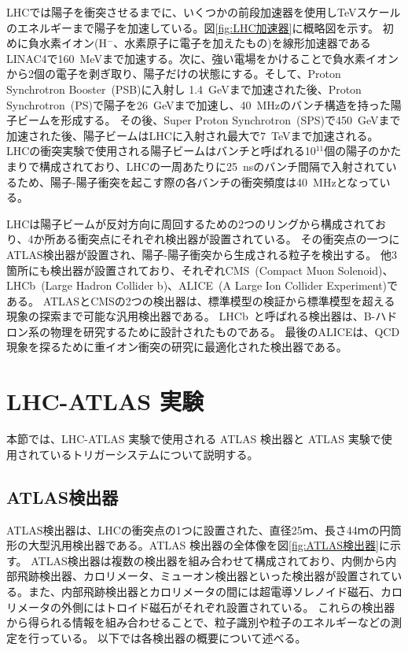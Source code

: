 LHCでは陽子を衝突させるまでに、いくつかの前段加速器を使用しTeVスケールのエネルギーまで陽子を加速している。図\ref{fig:LHC加速器}に概略図を示す。
初めに負水素イオン(H$^-$、水素原子に電子を加えたもの)を線形加速器であるLINAC4\cite{article:Linearaccelerator4}で160~MeVまで加速する。次に、強い電場をかけることで負水素イオンから2個の電子を剥ぎ取り、陽子だけの状態にする。そして、Proton Synchrotron Booster~(PSB)\cite{article:TheProtonSynchrotronBooster}に入射し 1.4~GeVまで加速された後、Proton Synchrotron~(PS)\cite{article:TheProtonSynchrotron}で陽子を26~GeVまで加速し、40~MHzのバンチ構造を持った陽子ビームを形成する。
その後、Super Proton Synchrotron~(SPS)\cite{article:TheSuperProtonSynchrotron}で450~GeVまで加速された後、陽子ビームはLHCに入射され最大で7~TeVまで加速される。
LHCの衝突実験で使用される陽子ビームはバンチと呼ばれる10$^{11}$個の陽子のかたまりで構成されており、LHCの一周あたりに25~nsのバンチ間隔で入射されているため、陽子-陽子衝突を起こす際の各バンチの衝突頻度は40~MHzとなっている。

LHCは陽子ビームが反対方向に周回するための2つのリングから構成されており、4か所ある衝突点にそれぞれ検出器が設置されている。
その衝突点の一つにATLAS検出器が設置され、陽子-陽子衝突から生成される粒子を検出する。
他3箇所にも検出器が設置されており、それぞれCMS~(Compact Muon Solenoid)\cite{article:CMSExperiment}、LHCb~(Large Hadron Collider b)\cite{article:LHCbExperiment}、ALICE~(A Large Ion Collider Experiment)\cite{article:ALICEExperiment}である。
ATLASとCMSの2つの検出器は、標準模型の検証から標準模型を超える現象の探索まで可能な汎用検出器である。
LHCb~と呼ばれる検出器は、B-ハドロン系の物理を研究するために設計されたものである。
最後のALICEは、QCD現象を探るために重イオン衝突の研究に最適化された検出器である。


\section{LHC-ATLAS 実験}\label{section2-2}
本節では、LHC-ATLAS 実験で使用される ATLAS 検出器と ATLAS 実験で使用されているトリガーシステムについて説明する。

\subsection{ATLAS検出器}
ATLAS検出器は、LHCの衝突点の1つに設置された、直径25ｍ、長さ44ｍの円筒形の大型汎用検出器である\cite{Aad:1129811}。ATLAS 検出器の全体像を図\ref{fig:ATLAS検出器}に示す。
ATLAS検出器は複数の検出器を組み合わせて構成されており、内側から内部飛跡検出器、カロリメータ、ミューオン検出器といった検出器が設置されている。また、内部飛跡検出器とカロリメータの間には超電導ソレノイド磁石、カロリメータの外側にはトロイド磁石がそれぞれ設置されている。
これらの検出器から得られる情報を組み合わせることで、粒子識別や粒子のエネルギーなどの測定を行っている。
以下では各検出器の概要について述べる。

